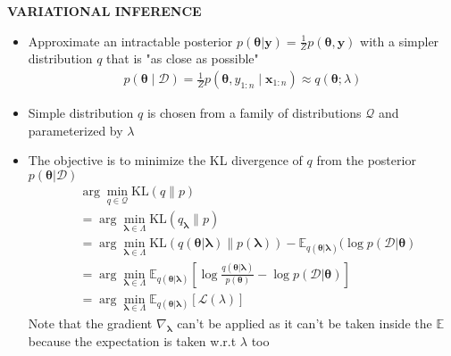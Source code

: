 \begin{whitebox}{\textbf{VARIATIONAL INFERENCE}}
    \begin{itemize}
        \item Approximate an intractable posterior $p(\bm{\theta}| \bm{y})=\frac{1}{Z}p(\bm{\theta},\bm{y})$ with a simpler distribution $q$ that is "as close as possible"
        \begin{align*}
            p(\bm{\theta}\mid\mathcal{D})=\frac{1}{Z}p(\bm{\theta},y_{1:n}\mid\bm{x}_{1:n})\approx q(\bm{\theta};\lambda)
        \end{align*}
        \item Simple distribution $q$ is chosen from a family of distributions $\mathcal{Q}$ and parameterized by $\lambda$
        \item The objective is to minimize the KL divergence of $q$ from the posterior $p(\bm{\theta}|\mathcal{D})$
        \begin{align*}
            &\arg\min_{q\in\mathcal{Q}}\mathrm{KL}(q\|p)\\
            &=\arg\min_{\bm{\lambda}\in\Lambda}\mathrm{KL}(q_{\bm{\lambda}}\|p)\\
            &=\arg\min_{\bm{\lambda}\in\Lambda}\mathrm{KL}(q(\bm{\theta}|\bm{\lambda})\|p(\bm{\lambda}))-\mathbb{E}_{q(\bm{\theta}|\bm{\lambda})}(\log p(\mathcal{D}|\bm{\theta})\\
            &=\arg\min_{\bm{\lambda}\in\Lambda}\mathbb{E}_{q(\bm{\theta}|\bm{\lambda})}\left[\log\frac{q(\bm{\theta}|\bm{\lambda})}{p(\bm{\theta})}-\log p(\mathcal{D}|\bm{\theta})\right]\\
            &=\arg\min_{\bm{\lambda}\in\Lambda}\mathbb{E}_{q(\bm{\theta}|\bm{\lambda})}[\mathcal{L}(\lambda)]
        \end{align*}
        Note that the gradient $\nabla_{\bm{\lambda}}$ can't be applied as it can't be taken inside the $\mathbb{E}$ because the expectation is taken w.r.t $\lambda$ too
        \begin{center}
\end{center}
\end{itemize}
\end{whitebox}
